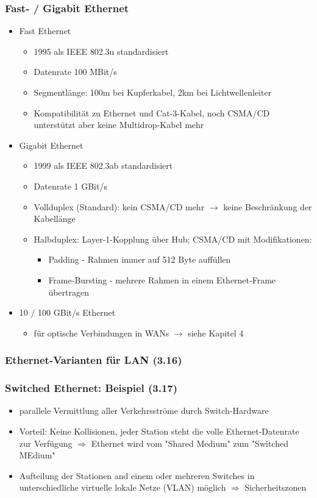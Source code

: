\subsubsection{Fast- / Gigabit Ethernet}
\begin{itemize}
	\item Fast Ethernet
	\begin{itemize}
		\item 1995 als IEEE 802.3u standardisiert
		\item Datenrate 100 MBit/s
		\item Segmentlänge: 100m bei Kupferkabel, 2km bei Lichtwellenleiter
		\item Kompatibilität zu Ethernet und Cat-3-Kabel, noch CSMA/CD unterstützt aber keine Multidrop-Kabel mehr
	\end{itemize}
	\item Gigabit Ethernet
	\begin{itemize}
		\item 1999 als IEEE 802.3ab standardisiert
		\item Datenrate 1 GBit/s
		\item Vollduplex (Standard): kein CSMA/CD mehr \(\to\) keine Beschränkung der Kabellänge
		\item Halbduplex: Layer-1-Kopplung über Hub; CSMA/CD mit Modifikationen: 
		\begin{itemize}
			\item Padding - Rahmen immer auf 512 Byte auffüllen
			\item Frame-Bursting - mehrere Rahmen in einem Ethernet-Frame übertragen
		\end{itemize}
	\end{itemize}
	\item 10 / 100 GBit/s Ethernet
	\begin{itemize}
		\item für optische Verbindungen in WANs \(\to\) siehe Kapitel 4
	\end{itemize}
\end{itemize}
\subsubsection{Ethernet-Varianten für LAN (3.16)}
\subsubsection{Switched Ethernet: Beispiel (3.17)}
\begin{itemize}
	\item parallele Vermittlung aller Verkehrsströme durch Switch-Hardware
	\item Vorteil: Keine Kollisionen, jeder Station steht die volle Ethernet-Datenrate zur Verfügung \(\Rightarrow\) Ethernet wird vom "Shared Medium" zum "Switched MEdium"
	\item Aufteilung der Stationen and einem oder mehreren Switches in unterschiedliche virtuelle lokale Netze (VLAN) möglich \(\Rightarrow\) Sicherheitszonen
\end{itemize}

